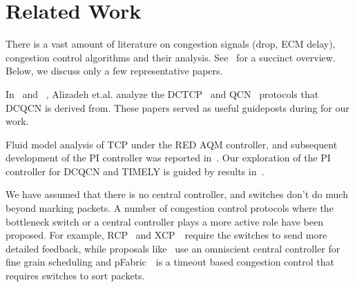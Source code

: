 \section{Related Work}
\label{sec:related}

There is a vast amount of literature on congestion signals (drop, ECM delay),
congestion control algorithms and their analysis. See~\cite{srikantbook} for a
succinct overview. Below, we discuss only a few representative papers.

In~\cite{dctcp-analysis} and ~\cite{qcn-analysis}, Alizadeh et.al. analyze the
DCTCP~\cite{dctcp} and QCN~\cite{qcn} protocols that DCQCN is derived from. These papers served as useful guideposts during for our work.

Fluid model analysis of TCP under the RED AQM controller, and subsequent
development of the PI controller was reported
in~\cite{misra2000fluid,hollot2001designing}. Our exploration of the PI
controller for DCQCN and TIMELY is guided by results
in~\cite{hollot2001designing}.

We have assumed that there is no central controller, and switches don't do much
beyond marking packets. A number of congestion control protocols where the
bottleneck switch or a central controller plays a more active role have been
proposed.  For example, RCP~\cite{dukkipati2006rcp} and
XCP~\cite{katabi2002congestion}~require the switches to send more detailed
feedback, while proposals like~\cite{vattikonda2012practical,wilson2011better}
use an omniscient central controller for fine grain scheduling and
pFabric~\cite{pfabric}~is a timeout based congestion control that requires
switches to sort packets. 



